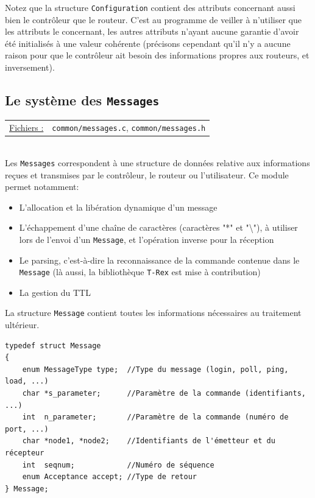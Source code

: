 \documentclass[a4paper,11pt]{article}
\begin{document}
Notez que la structure \texttt{Configuration} contient des attributs concernant aussi bien le contrôleur que le routeur. C'est au programme de veiller à n'utiliser que les attributs le concernant, les autres attributs n'ayant aucune garantie d'avoir été initialisés à une valeur cohérente (précisons cependant qu'il n'y a aucune raison pour que le contrôleur ait besoin des informations propres aux routeurs, et inversement).

\subsection{Le système des \texttt{Messages}}
\label{message}

\begin{tabularx}{\linewidth}{lX}
\underline{Fichiers :} & \texttt{common/messages.c}, \texttt{common/messages.h}\\
\end{tabularx}\\

Les \texttt{Messages} correspondent à une structure de données relative aux informations reçues et transmises par le contrôleur, le routeur ou l'utilisateur. Ce module permet notamment:
\begin{itemize}
 \item L'allocation et la libération dynamique d'un message
 \item L'échappement d'une chaîne de caractères (caractères "*" et "\textbackslash"), à utiliser lors de l'envoi d'un \texttt{Message}, et l'opération inverse pour la réception
 \item Le parsing, c'est-à-dire la reconnaissance de la commande contenue dans le \texttt{Message} (là aussi, la bibliothèque \texttt{T-Rex} est mise à contribution)
 \item La gestion du TTL
\end{itemize}
La structure \texttt{Message} contient toutes les informations nécessaires au traitement ultérieur.

\begin{lstlisting}
typedef struct Message
{
	enum MessageType type;  //Type du message (login, poll, ping, load, ...)
	char *s_parameter;      //Paramètre de la commande (identifiants, ...)
	int  n_parameter;       //Paramètre de la commande (numéro de port, ...)
	char *node1, *node2;    //Identifiants de l'émetteur et du récepteur
	int  seqnum;            //Numéro de séquence
	enum Acceptance accept; //Type de retour
} Message;
\end{lstlisting}
\end{document}
